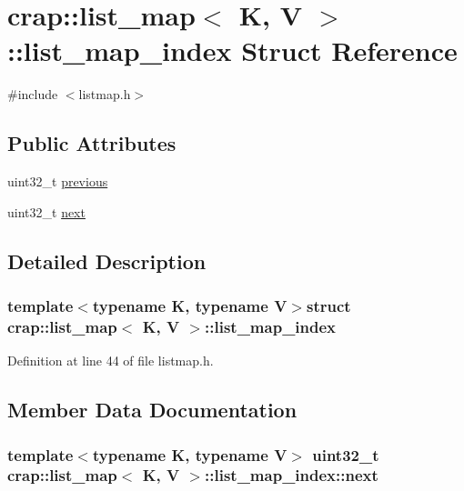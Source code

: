 \hypertarget{structcrap_1_1list__map_1_1list__map__index}{}\section{crap\+:\+:list\+\_\+map$<$ K, V $>$\+:\+:list\+\_\+map\+\_\+index Struct Reference}
\label{structcrap_1_1list__map_1_1list__map__index}


{\ttfamily \#include $<$listmap.\+h$>$}

\subsection*{Public Attributes}
\begin{DoxyCompactItemize}
\item 
uint32\+\_\+t \hyperlink{structcrap_1_1list__map_1_1list__map__index_a8e8b7713b93e3733e4663c46e26661ac}{previous}
\item 
uint32\+\_\+t \hyperlink{structcrap_1_1list__map_1_1list__map__index_a020ab02040190f18d576bd851dd7ed11}{next}
\end{DoxyCompactItemize}


\subsection{Detailed Description}
\subsubsection*{template$<$typename K, typename V$>$struct crap\+::list\+\_\+map$<$ K, V $>$\+::list\+\_\+map\+\_\+index}



Definition at line 44 of file listmap.\+h.



\subsection{Member Data Documentation}
\hypertarget{structcrap_1_1list__map_1_1list__map__index_a020ab02040190f18d576bd851dd7ed11}{}
\subsubsection[{next}]{\setlength{\rightskip}{0pt plus 5cm}template$<$typename K, typename V$>$ uint32\+\_\+t {\bf crap\+::list\+\_\+map}$<$ K, V $>$\+::list\+\_\+map\+\_\+index\+::next}\label{structcrap_1_1list__map_1_1list__map__index_a020ab02040190f18d576bd851dd7ed11}



